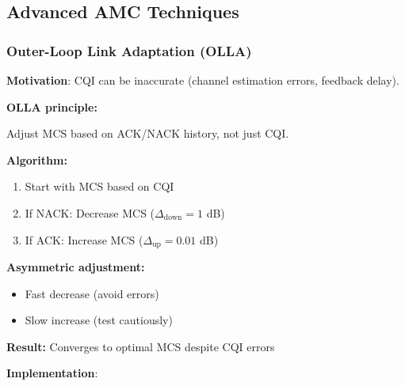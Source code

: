 \subsection{Advanced AMC Techniques}\label{advanced-amc-techniques}

\subsubsection{Outer-Loop Link Adaptation
(OLLA)}\label{outer-loop-link-adaptation-olla}

\textbf{Motivation}: CQI can be inaccurate (channel estimation errors,
feedback delay).

\textbf{OLLA principle:}

Adjust MCS based on ACK/NACK history, not just CQI.

\textbf{Algorithm:}
\begin{enumerate}
\item Start with MCS based on CQI
\item If NACK: Decrease MCS ($\Delta_{\text{down}} = 1$ dB)
\item If ACK: Increase MCS ($\Delta_{\text{up}} = 0.01$ dB)
\end{enumerate}

\textbf{Asymmetric adjustment:}
\begin{itemize}
\item Fast decrease (avoid errors)
\item Slow increase (test cautiously)
\end{itemize}

\textbf{Result:} Converges to optimal MCS despite CQI errors

\textbf{Implementation}:

